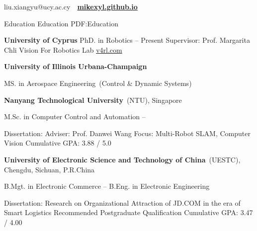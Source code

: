 \documentclass[letterpaper,MMMyyyy,nonstopmode]{simpleresumecv}
\newcommand{\CVAuthor}{Mike Xiangyu Liu}
\begin{document}

\Title{\CVAuthor}

\begin{SubTitle}
\par
\href{liu.xiangyu@ucy.ac.cy}
\large{liu.xiangyu@ucy.ac.cy}
\,\SubBulletSymbol\,
\href{https://mikexyl.github.io/}
\large{\textbf{\underline{mikexyl.github.io}}}
\end{SubTitle}

\begin{Body}


\Section
{Education}
{Education}
{PDF:Education}

\Entry

{\textbf{University of Cyprus}}
\BulletItem
PhD. in Robotics
\hfill
{} -- Present
\BulletItem
Supervisor: Prof. Margarita Chli
\BulletItem
Vision For Robotics Lab \href{https://v4rl.com/}{\color{blue}v4rl.com}

\BigGap

{\textbf{University of Illinois Urbana-Champaign}}

\BulletItem
MS. in Aerospace Engineering~(Control \& Dynamic Systems)
\hfill
{}

\BigGap
\Entry
{\textbf{Nanyang Technological University}~(NTU)},
Singapore

\BulletItem
M.Sc. in
{Computer Control and Automation}
\hfill
{} --
\begin{Detail}
\SubBulletItem
Dissertation:
{\href{https://www.researchgate.net/publication/340996925_QUANTITATIVE_TRAJECTORY_EVALUATION_CRITERION_AND_LONG-TERM_ENHANCEMENT_FOR_MULTI-ROBOT_SLAM}{\color{blue}{Quantitative Trajectory Evaluation Criterion and Long-term Enhancement for Multi-Robot SLAM}}\cite{xiangyu2019quantitative}}
\SubBulletItem
Adviser:
Prof. Danwei Wang
\SubBulletItem
Focus:
Multi-Robot SLAM, Computer Vision
\SubBulletItem
Cumulative GPA: 3.88 / 5.0
\end{Detail}

\BigGap
\Entry
{\textbf{University of Electronic Science and Technology of China}~(UESTC)},
Chengdu, Sichuan, P.R.China

\BulletItem
B.Mgt. in 
{Electronic Commerce}
\hfill
{} --
\BulletItem
B.Eng. in 
{Electronic Engineering}
\begin{Detail}
\SubBulletItem
Dissertation:
	{Research on Organizational Attraction of JD.COM in the era of Smart Logistics \cite{lxybachelor2018}}
\SubBulletItem
Recommended Postgraduate Qualification
\SubBulletItem
Cumulative GPA: 3.47 / 4.00
\end{Detail}


\end{Body}
\end{document}
